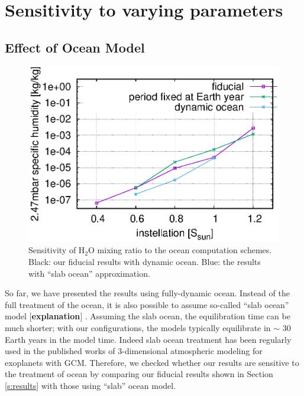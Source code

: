 \documentclass[11pt,numberedappendix,twocolappendix,]{emulateapj}
\def\water{H$_2$O }
\def\memo#1{\color{red}$[${\bf #1}$]$ \color{black}}
\begin{document}
\section{Sensitivity to varying parameters}
\label{s:sensitivity}

\subsection{Effect of Ocean Model}
\label{ss:sensitivity_ocean}


\begin{figure}[!h]
    \begin{center}
    \includegraphics[width=\hsize]{fig/AqOH0TLS_GJ876_q_sensitivity_changeS0X.eps}
    \end{center}
\caption{Sensitivity of \water mixing ratio to the ocean computation schemes. Black: our fiducial results with dynamic ocean. Blue: the results with ``slab ocean'' approximation. }
\label{fig:change_ocean}
\end{figure}

So far, we have presented the results using fully-dynamic ocean. 
Instead of the full treatment of the ocean, it is also possible to assume so-called ``slab ocean'' model \memo{explanation}. 
Assuming the slab ocean, the equilibration time can be much shorter; with our configurations, the models typically equilibrate in $\sim $ 30 Earth years in the model time. 
Indeed slab ocean treatment has been regularly used in the published works of 3-dimensional atmospheric modeling for exoplanets with GCM. 
Therefore, we checked whether our results are sensitive to the treatment of ocean by comparing our fiducial results shown in Section \ref{s:results} with those using ``slab'' ocean model. 
\end{document}
